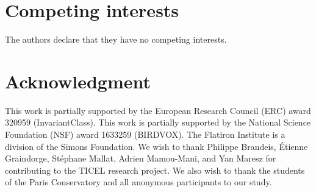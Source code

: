 \documentclass{bmcart}
\newcommand{\nmu}{}
\begin{document}
\begin{backmatter}

\section*{\nmu Competing interests}
  The authors declare that they have no competing interests.


\section*{\nmu Acknowledgment}
This work is partially supported by the European Research Council (ERC) award 320959 (InvariantClass).
This work is partially supported by the National Science Foundation (NSF) award 1633259 (BIRDVOX).
The Flatiron Institute is a division of the Simons Foundation.
We wish to thank Philippe Brandeis, \'{E}tienne Graindorge, St\'{e}phane Mallat, Adrien Mamou-Mani, and Yan Maresz for contributing to the TICEL research project.
We also wish to thank the students of the Paris Conservatory and all anonymous participants to our study.


% 
% 



\end{backmatter}
\end{document}
